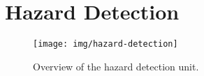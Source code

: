 \section{Hazard Detection}
\begin{figure}[h]
    \centering
    \texttt{[image: img/hazard-detection]}
    \caption{
      Overview of the hazard detection unit.
    }
    \label{fig:hazard-detection}
\end{figure}
